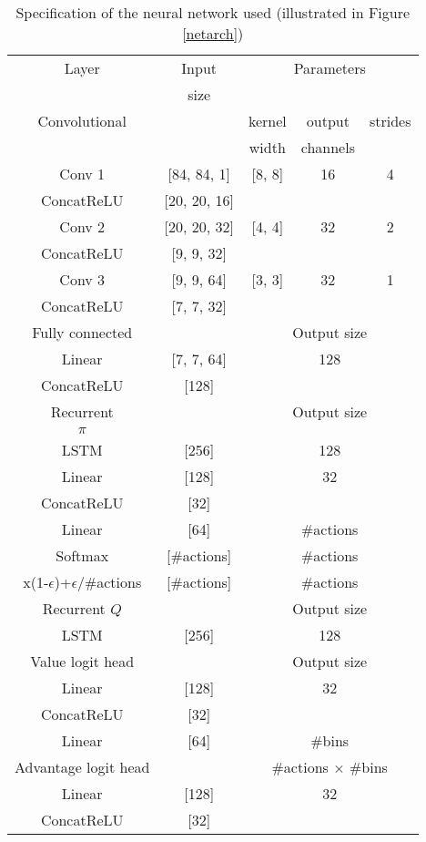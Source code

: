 \documentclass{article}
\begin{document}
\begin{table}[ht]
\caption{Specification of the neural network used (illustrated in Figure 
\ref{netarch})}
\label{specs-table}
\vskip 0.1in
\begin{center}
\begin{sc}
\begin{tabular}{| c | c | c | c | c |}
\hline
Layer & Input & \multicolumn{3}{|c|}{ Parameters} \\
      & size  & \multicolumn{3}{|c|}{ } \\
\hline
Convolutional & & kernel & output & strides\\
              & & width & channels & \\
\hline
Conv 1 & [84, 84, 1] & [8, 8] & 16 & 4 \\
ConcatReLU & [20, 20, 16] & & & \\
Conv 2 & [20, 20, 32] & [4, 4] & 32 & 2 \\
ConcatReLU & [9, 9, 32] & & & \\
Conv 3 & [9, 9, 64] & [3, 3] & 32 & 1 \\
ConcatReLU & [7, 7, 32] & & & \\
\hline
Fully connected & & \multicolumn{3}{|c|}{ Output size} \\
\hline
Linear & [7, 7, 64] & \multicolumn{3}{|c|}{ 128 }\\
ConcatReLU & [128] & \multicolumn{3}{|c|}{} \\
\hline
Recurrent & & \multicolumn{3}{|c|}{ Output size} \\
$\pi$ & & \multicolumn{3}{|c|}{ } \\
\hline
LSTM & [256] & \multicolumn{3}{|c|}{ 128 }\\
Linear & [128] & \multicolumn{3}{|c|}{ 32 }\\
ConcatReLU & [32] & \multicolumn{3}{|c|}{ }\\
Linear & [64] & \multicolumn{3}{|c|}{ \#actions }\\
Softmax & [\#actions] & \multicolumn{3}{|c|}{ \#actions }\\
x(1-$\epsilon$)+$\epsilon$/\#actions & [\#actions] & \multicolumn{3}{|c|}{ 
\#actions }\\
\hline
Recurrent $Q$ & & \multicolumn{3}{|c|}{ Output size} \\
\hline
LSTM & [256] & \multicolumn{3}{|c|}{ 128 }\\
\hline
Value logit head & & \multicolumn{3}{|c|}{  Output size} \\
\hline
Linear & [128] & \multicolumn{3}{|c|}{ 32 }\\
ConcatReLU & [32] & \multicolumn{3}{|c|}{ }\\
Linear & [64] & \multicolumn{3}{|c|}{ \#bins }\\
\hline
Advantage logit head & & \multicolumn{3}{|c|}{ \#actions $\times$ \#bins} \\
\hline
Linear & [128] & \multicolumn{3}{|c|}{ 32 }\\
ConcatReLU & [32] & \multicolumn{3}{|c|}{ }\\
\hline
\end{tabular}
\end{sc}
\end{center}
\vskip -0.1in
\end{table}
\newpage
\end{document}
